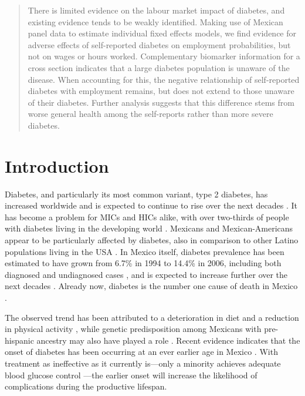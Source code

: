 
\begin{abstract}
There is limited evidence on the labour market impact of diabetes, and existing evidence tends to be weakly identified. Making use of Mexican panel data to estimate individual fixed effects models, we find evidence for adverse effects of self-reported diabetes on employment probabilities, but not on wages or hours worked. Complementary biomarker information for a cross section indicates that a large diabetes population is unaware of the disease. When accounting for this, the negative relationship of self-reported diabetes with employment remains, but does not extend to those unaware of their diabetes. Further analysis suggests that this difference stems from worse general health among the self-reports rather than more severe diabetes.
\end{abstract}



\section{\label{sec:Introduction4}Introduction }

Diabetes, and particularly its most common variant, type 2 diabetes, has increased worldwide and is expected to continue to rise over the next decades \parencite{Risk2016}. It has become a problem for \acp{MIC} and \acp{HIC} alike, with over two-thirds of people with diabetes living in the developing world \parencite{InternationalDiabetesFederation2013}. Mexicans and Mexican-Americans appear to be particularly affected by diabetes, also in comparison to other Latino populations living in the USA \parencite{Schneiderman2014}. In Mexico itself, diabetes prevalence has been estimated to have grown from 6.7\% in 1994 to 14.4\% in 2006, including both diagnosed and undiagnosed cases \parencite{Barquera2013}, and is expected to increase further over the next decades \parencite{Meza2015}. Already now, diabetes is the number one cause of death in Mexico \parencite{Barquera2013}. 

The observed trend has been attributed to a deterioration in diet and a reduction in physical activity \parencite{Barquera2008b,Basu2013}, while genetic predisposition among Mexicans with pre-hispanic ancestry may also have played a role \parencite{Williams2013}. Recent evidence indicates that the onset of diabetes has been occurring at an ever earlier age in Mexico \parencite{Villalpando2010}. With treatment as ineffective as it currently is---only a minority achieves adequate blood glucose control \parencite{Barquera2013}---the earlier onset will increase the likelihood of complications during the productive lifespan. 


